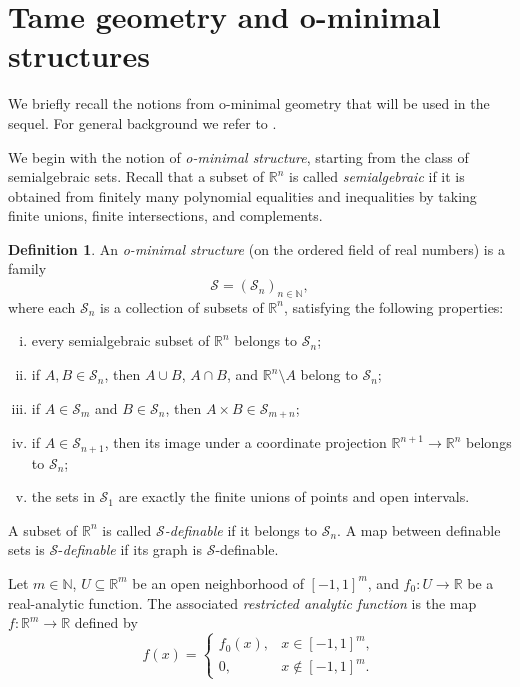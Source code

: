 \documentclass[a4paper,11pt,reqno]{amsart}
\theoremstyle{plain}
\theoremstyle{definition}
\newtheorem{definition}[theorem]{Definition}
\newcommand{\R}{\mathbb R}
\newcommand{\N}{\mathbb N}
\begin{document}
\section{Tame geometry and o-minimal structures}\label{sec:tame-sets}

We briefly recall the notions from o-minimal geometry that will be used in the sequel. For general background we refer to \cite{MR1633348}.

We begin with the notion of \emph{o-minimal structure}, starting from the class of semialgebraic sets. Recall that a subset of $\R^n$ is called \emph{semialgebraic} if it is obtained from finitely many polynomial equalities and inequalities by taking finite unions, finite intersections, and complements.

\begin{definition} \label{def:o-minimal_structure}
An \emph{o-minimal structure} (on the ordered field of real numbers) is a family
\[
\mathcal S=(\mathcal S_n)_{n\in\N},
\]
where each $\mathcal S_n$ is a collection of subsets of $\R^n$, satisfying the following properties:
\begin{enumerate}[(i)]
    \item every semialgebraic subset of $\R^n$ belongs to $\mathcal S_n$;
    \item if $A,B\in\mathcal S_n$, then $A\cup B$, $A\cap B$, and $\R^n\setminus A$ belong to $\mathcal S_n$;
    \item if $A\in\mathcal S_m$ and $B\in\mathcal S_n$, then $A\times B\in\mathcal S_{m+n}$;
    \item if $A\in\mathcal S_{n+1}$, then its image under a coordinate projection $\R^{n+1}\to\R^n$ belongs to $\mathcal S_n$;
    \item the sets in $\mathcal S_1$ are exactly the finite unions of points and open intervals.
\end{enumerate}
A subset of $\R^n$ is called \emph{$\mathcal{S}$-definable} if it belongs to $\mathcal S_n$. A map between definable sets is $\mathcal{S}$-\emph{definable} if its graph is $\mathcal{S}$-definable.
\end{definition}

Let $m\in\N$, $U\subseteq\R^m$ be an open neighborhood of $[-1,1]^m$, and $f_0 \colon U\to\R$ be a real-analytic function. The associated \emph{restricted analytic function} is the map $f:\R^m\to\R$ defined by
\[
f(x)=
\begin{cases}
f_0(x), & x\in[-1,1]^m,\\
0, & x\notin[-1,1]^m.
\end{cases}
\]
\end{document}
